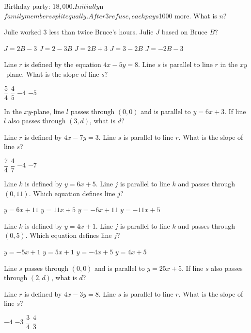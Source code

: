 \documentclass[12pt]{exam}
\begin{document}
\begin{questions}
\question Birthday party: $18,000. Initially $n$ family members split equally. After 3 refuse, each pays $1000 more. What is $n$?

\question Julie worked 3 less than twice Bruce's hours. Julie $J$ based on Bruce $B$?
\begin{choices}
\choice $J = 2B - 3$
\choice $J = 2 - 3B$
\choice $J = 2B + 3$
\choice $J = 3 - 2B$
\choice $J = -2B - 3$
\end{choices}

\question Line $r$ is defined by the equation $4x - 5y = 8$. Line $s$ is parallel to line $r$ in the $xy$-plane. What is the slope of line $s$?
\begin{choices}
\choice $\dfrac{5}{4}$
\choice $\dfrac{4}{5}$
\choice $-4$
\choice $-5$
\end{choices}

\question In the $xy$-plane, line $l$ passes through $(0,0)$ and is parallel to $y = 6x + 3$. If line $l$ also passes through $(3,d)$, what is $d$?

\question Line $r$ is defined by $4x - 7y = 3$. Line $s$ is parallel to line $r$. What is the slope of line $s$?
\begin{choices}
\choice $\dfrac{7}{4}$
\choice $\dfrac{4}{7}$
\choice $-4$
\choice $-7$
\end{choices}

\question Line $k$ is defined by $y = 6x + 5$. Line $j$ is parallel to line $k$ and passes through $(0,11)$. Which equation defines line $j$?
\begin{choices}
\choice $y = 6x + 11$
\choice $y = 11x + 5$
\choice $y = -6x + 11$
\choice $y = -11x + 5$
\end{choices}

\question Line $k$ is defined by $y = 4x + 1$. Line $j$ is parallel to line $k$ and passes through $(0,5)$. Which equation defines line $j$?
\begin{choices}
\choice $y = -5x + 1$
\choice $y = 5x + 1$
\choice $y = -4x + 5$
\choice $y = 4x + 5$
\end{choices}

\question Line $s$ passes through $(0,0)$ and is parallel to $y = 25x + 5$. If line $s$ also passes through $(2,d)$, what is $d$?
\begin{choices}
\end{choices}

\question Line $r$ is defined by $4x - 3y = 8$. Line $s$ is parallel to line $r$. What is the slope of line $s$?
\begin{choices}
\choice $-4$
\choice $-3$
\choice $\dfrac{3}{4}$
\choice $\dfrac{4}{3}$
\end{choices}


\end{questions}
\end{document}
